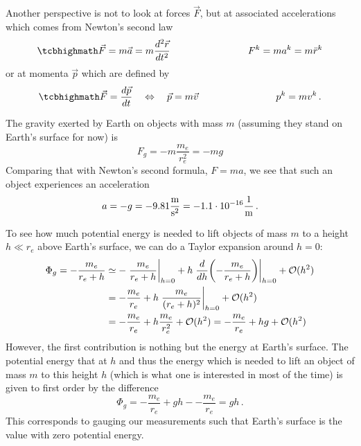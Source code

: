 Another perspective is not to look at forces $\vec{F}$, but at associated accelerations which comes from Newton's second law
\begin{equation}
\eqbox{
\vec{F} = m \vec{a} = m \dv[2]{\vec{r}}{t}
}
\manyqquad
F^k = m a^k = m \ddot{r}^k
\end{equation}
or at momenta $\vec{p}$ which are defined by
\begin{equation}
\eqbox{
\vec{F} = \dv{\vec{p}}{t} \quad \Leftrightarrow \quad \vec{p} = m \vec{v}
}
\manyqquad
p^k = m v^k \, .
\end{equation}



\begin{ex}
The gravity exerted by Earth on objects with mass $m$ (assuming they stand on Earth's surface for now) is
\begin{equation}
F_g = - m \frac{m_e}{r_e^2} = - m g
\end{equation}
Comparing that with Newton's second formula, $F = m a$, we see that such an object experiences an acceleration
\begin{equation}
a = - g = - 9.81 \frac{\metre}{\second^2} = - 1.1 \cdot 10^{-16} \frac{1}{\metre} \, .
\end{equation}

To see how much potential energy is needed to lift objects of mass $m$ to a height $h \ll r_e$ above Earth's surface, we can do a Taylor expansion around $h = 0$:
\begin{align*}
\Phi_g = - \frac{m_e}{r_e + h} &\simeq - \eval{\frac{m_e}{r_e + h}}_{h = 0} + h \eval{\dv{h}\qty(- \frac{m_e}{r_e + h})}_{h = 0} + \mathcal{O}(h^2)
\\
&= - \frac{m_e}{r_e} + h \eval{\frac{m_e}{(r_e + h)^2}}_{h = 0} + \mathcal{O}(h^2)
\\
&= - \frac{m_e}{r_e} + h \frac{m_e}{r_e^2} + \mathcal{O}(h^2) = - \frac{m_e}{r_e} + h g + \mathcal{O}(h^2)
\end{align*}
However, the first contribution is nothing but the energy at Earth's surface. The potential energy that at $h$ and thus the energy which is needed to lift an object of mass $m$ to this height $h$ (which is what one is interested in most of the time) is given to first order by the difference
\begin{equation}
\Phi_g =  - \frac{m_e}{r_e} + g h - - \frac{m_e}{r_e} = g h \, .
\end{equation}
This corresponds to gauging our measurements such that Earth's surface is the value with zero potential energy.
\end{ex}


